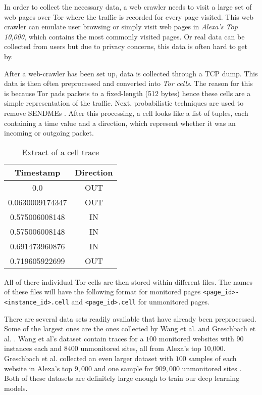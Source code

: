 In order to collect the necessary data, a web crawler needs to visit a large set of web pages over Tor where the traffic is recorded for every page visited.
This web crawler can emulate user browsing or simply visit web pages in \textit{Alexa's Top 10,000}, which contains the most commonly visited pages.
Or real data can be collected from users but due to privacy concerns, this data is often hard to get by.

After a web-crawler has been set up, data is collected through a TCP dump.
This data is then often preprocessed and converted into \textit{Tor cells}.
The reason for this is because Tor pads packets to a fixed-length (512 bytes) \cite{tor_project} hence these cells are a simple representation of the traffic.
Next, probabilistic techniques are used to remove SENDMEs \cite{wang_goldberg_2013}.
After this processing, a cell looks like a list of tuples, each containing a time value and a direction, which represent whether it was an incoming or outgoing packet.

\begin{table}[ht]
\centering
  \begin{tabular}{ c | c }
    \textbf{Timestamp} & \textbf{Direction} \\ \hline
      0.0&OUT \\
      0.0630009174347&OUT \\
      0.575006008148&IN \\
      0.575006008148&IN \\
      0.691473960876&IN \\
      0.719605922699&OUT \\
  \end{tabular}
  \caption{Extract of a cell trace \cite{greschbach2016effect}}
  \label{table:cell-extract}
\end{table}

All of there individual Tor cells are then stored within different files.
The names of these files will have the following format for monitored pages \texttt{<page\_id>-<instance\_id>.cell} and \texttt{<page\_id>.cell} for unmonitored pages.

There are several data sets readily available that have already been preprocessed.
Some of the largest ones are the ones collected by Wang et al. \cite{wang_cai_johnson_nithyanand_goldberg_2014} and Greschbach et al. \cite{greschbach2016effect}.
Wang et al's dataset contain traces for a $100$ monitored websites with $90$ instances each and $8400$ unmonitored sites, all from Alexa's top 10,000.
Greschbach et al. collected an even larger dataset with $100$ samples of each website in Alexa's top $9,000$ and one sample for $909,000$ unmonitored sites \cite{greschbach2016effect}.
Both of these datasets are definitely large enough to train our deep learning models.
